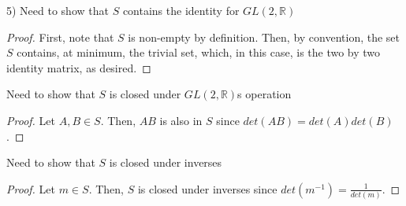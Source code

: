 \documentclass[executivepaper]{article}
\begin{document}
\begin{flushleft}

5) Need to show that $S$ contains the identity for $GL(2, \mathbb{R})$

\begin{center}

\begin{proof}

First, note that $S$ is non-empty by definition. Then, by convention, the set $S$ contains, at minimum, the trivial set, which, in this case, is the two by two identity matrix, as desired.

\end{proof}

\end{center}

Need to show that $S$ is closed under $GL(2, \mathbb{R})$\textsc{}s operation

\begin{center}

\begin{proof}

Let $A, B \in S$. Then, $AB$ is also in $S$ since $det(AB)=det(A)det(B)$.

\end{proof}

\end{center}

Need to show that $S$ is closed under inverses

\begin{center}

\begin{proof}

Let $m \in S$. Then, $S$ is closed under inverses since $det(m^{-1})=\frac{1}{det(m)}$.

\end{proof}

\end{center}

\end{flushleft}
\end{document}
